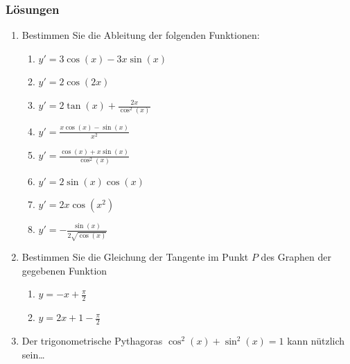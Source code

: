 \subsubsection*{Lösungen}
\begin{enumerate}
    \item Bestimmen Sie die Ableitung der folgenden Funktionen:
          \begin{enumerate}
              \item $y' = 3\cos(x) - 3x\sin(x)$
              \item $y' = 2\cos(2x)$
              \item $y' = 2\tan(x) + \frac{2x}{\cos^2(x)}$
              \item $y' = \frac{x\cos(x)-\sin(x)}{x^2}$
              \item $y' = \frac{\cos(x)+x\sin(x)}{\cos^2(x)}$
              \item $y' = 2\sin(x)\cos(x)$
              \item $y' = 2x\cos(x^2)$
              \item $y' = -\frac{\sin(x)}{2\sqrt{\cos(x)}}$
          \end{enumerate}
    \item Bestimmen Sie die Gleichung der Tangente im Punkt $P$ des Graphen der gegebenen Funktion
          \begin{enumerate}
              \item $y= -x+\frac{\pi}{2}$
              \item $y= 2x+1-\frac{\pi}{2}$
          \end{enumerate}
    \item Der trigonometrische Pythagoras $\cos^2(x)+\sin^2(x) = 1$ kann nützlich sein\dots
\end{enumerate}






































